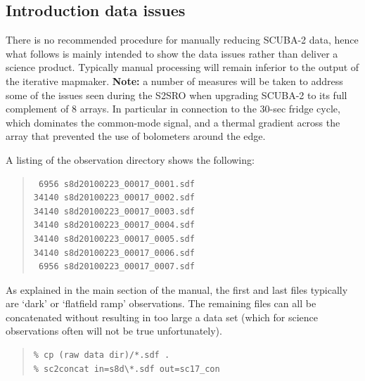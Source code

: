 \documentclass[twoside,11pt]{article}
\newcommand{\xlabel}[1]{}
\renewcommand{\_}{\texttt{\symbol{95}}}
\newenvironment{myquote}{\begin{quote}\begin{small}}{\end{small}\end{quote}}
\begin{document}
\subsection{\xlabel{intro2}Introduction data issues}
\label{sec:intro2}

There is no recommended procedure for manually reducing SCUBA-2 data,
hence what follows is mainly intended to show the data issues rather
than deliver a science product. Typically manual processing will
remain inferior to the output of the iterative mapmaker. \textbf{Note:}
a number of measures will be taken to address some of the issues seen
during the S2SRO when upgrading SCUBA-2 to its full complement of 8
arrays. In particular in connection to the 30-sec fridge cycle, which
dominates the common-mode signal, and a thermal gradient across the
array that prevented the use of bolometers around the edge.

A listing of the observation directory shows the following:

\begin{myquote}
\begin{verbatim}
 6956 s8d20100223_00017_0001.sdf
34140 s8d20100223_00017_0002.sdf
34140 s8d20100223_00017_0003.sdf
34140 s8d20100223_00017_0004.sdf
34140 s8d20100223_00017_0005.sdf
34140 s8d20100223_00017_0006.sdf
 6956 s8d20100223_00017_0007.sdf
\end{verbatim}
\end{myquote}

As explained in the main section of the manual, the first and last
files typically are `dark' or `flatfield ramp' observations. The
remaining files can all be concatenated without resulting in too large
a data set (which for science observations often will not be true
unfortunately).

\begin{myquote}
\begin{verbatim}
% cp (raw data dir)/*.sdf .
% sc2concat in=s8d\*.sdf out=sc17_con
\end{verbatim}
\end{myquote}
\end{document}
